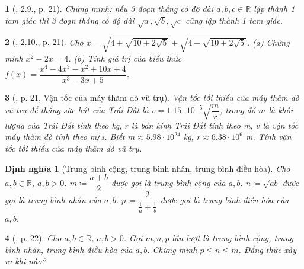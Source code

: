 \documentclass{article}
\newtheorem{baitoan}{}%
\newtheorem{dinhnghia}{Định nghĩa}
\begin{document}
\begin{baitoan}[\cite{Binh_boi_duong_Toan_9_tap_1}, 2.9., p. 21]
	Chứng minh: nếu 3 đoạn thẳng có độ dài $a,b,c\in\mathbb{R}$ lập thành 1 tam giác thì 3 đoạn thẳng có độ dài $\sqrt{a},\sqrt{b},\sqrt{c}$ cũng lập thành 1 tam giác.
\end{baitoan}

\begin{baitoan}[\cite{Binh_boi_duong_Toan_9_tap_1}, 2.10., p. 21]
	Cho $x = \sqrt{4 + \sqrt{10 + 2\sqrt{5}}} + \sqrt{4 - \sqrt{10 + 2\sqrt{5}}}$. (a) Chứng minh $x^2 - 2x = 4$. (b) Tính giá trị của biểu thức $f(x) = \dfrac{x^4 - 4x^3 - x^2 + 10x + 4}{x^3 - 3x + 5}$.
\end{baitoan}

\begin{baitoan}[\cite{Binh_boi_duong_Toan_9_tap_1}, p. 21, Vận tốc của máy thăm dò vũ trụ]
	Vận tốc tối thiểu của máy thăm dò vũ trụ để thắng sức hút của Trái Đất là $v = 1.15\cdot10^{-5}\sqrt{\dfrac{m}{r}}$, trong đó $m$ là khối lượng của Trái Đất tính theo {\rm kg}, $r$ là bán kính Trái Đất tính theo {\rm m}, $v$ là vận tốc máy thăm dò tính theo {\rm m{\tt/}s}. Biết $m\approx5.98\cdot10^{24}$ {\rm kg}, $r\approx6.38\cdot10^6$ {\rm m}. Tính vận tốc tối thiểu của máy thăm dò vũ trụ.
\end{baitoan}

\begin{dinhnghia}[Trung bình cộng, trung bình nhân, trung bình điều hòa]
	Cho $a,b\in\mathbb{R}$, $a,b > 0$. $m\coloneqq\dfrac{a + b}{2}$ được gọi là {\rm trung bình cộng} của $a,b$. $n\coloneqq\sqrt{ab}$ được gọi là {\rm trung bình nhân} của $a,b$. $p\coloneqq\dfrac{2}{\frac{1}{a} + \frac{1}{b}}$ được gọi là {\rm trung bình điều hòa} của $a,b$.
\end{dinhnghia}

\begin{baitoan}[\cite{Binh_boi_duong_Toan_9_tap_1}, p. 22]
	Cho $a,b\in\mathbb{R}$, $a,b > 0$. Gọi $m,n,p$ lần lượt là trung bình cộng, trung bình nhân, trung bình điều hòa của $a,b$. Chứng minh $p\le n\le m$. Đẳng thức xảy ra khi nào?
\end{baitoan}
\end{document}

